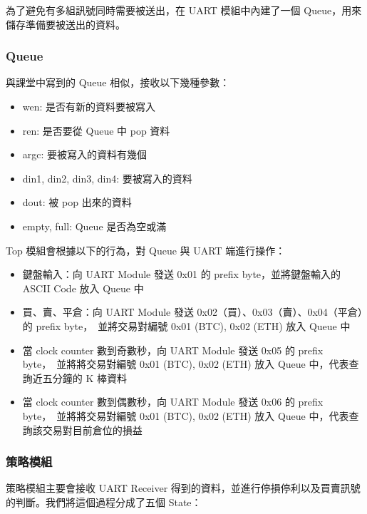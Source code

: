 \documentclass[10.5pt,compsoc,UTF8]{CjC}
\theoremstyle{mystyle}
\begin{document}
為了避免有多組訊號同時需要被送出，在 UART 模組中內建了一個 Queue，用來儲存準備要被送出的資料。

\subsubsection*{Queue}

與課堂中寫到的 Queue 相似，接收以下幾種參數：
\begin{itemize}
  \item wen: 是否有新的資料要被寫入
  \item ren: 是否要從 Queue 中 pop 資料
  \item argc: 要被寫入的資料有幾個
  \item din1, din2, din3, din4: 要被寫入的資料
  \item dout: 被 pop 出來的資料
  \item empty, full: Queue 是否為空或滿
\end{itemize}

Top 模組會根據以下的行為，對 Queue 與 UART 端進行操作：

\begin{itemize}
  \item 鍵盤輸入：向 UART Module 發送 0x01 的 prefix byte，並將鍵盤輸入的 ASCII Code 放入 Queue 中
  \item 買、賣、平倉：向 UART Module 發送 0x02（買）、0x03（賣）、0x04（平倉）的 prefix byte，\
        並將交易對編號 0x01 (BTC), 0x02 (ETH) 放入 Queue 中
  \item 當 clock counter 數到奇數秒，向 UART Module 發送 0x05 的 prefix byte，\
        並將將交易對編號 0x01 (BTC), 0x02 (ETH) 放入 Queue 中，代表查詢近五分鐘的 K 棒資料
  \item 當 clock counter 數到偶數秒，向 UART Module 發送 0x06 的 prefix byte，\
        並將將交易對編號 0x01 (BTC), 0x02 (ETH) 放入 Queue 中，代表查詢該交易對目前倉位的損益
\end{itemize}

\subsubsection*{策略模組}
策略模組主要會接收 UART Receiver 得到的資料，並進行停損停利以及買賣訊號的判斷。我們將這個過程分成了五個 State：
\end{document}
